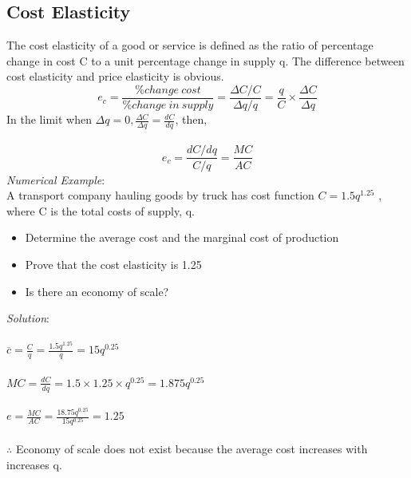 \subsection{Cost Elasticity}
The cost elasticity of a good or service is defined as the ratio of percentage change in cost C to a unit percentage change in supply q. The difference between cost elasticity and price elasticity is obvious.
\begin{equation}
	e_c = \frac{\% change \: cost}{\% change \: in \: supply} = \frac{\Delta C/C}{\Delta q/q} = \frac{q}{C} \times \frac{\Delta C}{\Delta q}
\end{equation}
In the limit when $\Delta q = 0, \frac{\Delta C}{\Delta q} = \frac{dC}{dq}$, then,\\\\
\begin{equation}
	e_c = \frac{dC/dq}{C/q} = \frac{MC}{AC}
\end{equation}
\textit{Numerical Example}:\\
A transport company hauling goods by truck has cost function $ C = 1.5q^{1.25}$ , where C is the total costs of supply, q.
\begin{itemize}
	\item Determine the average cost and the marginal cost of production
	\item Prove that the cost elasticity is 1.25
	\item Is there an economy of scale?
\end{itemize}
\textit{Solution}:\\\\
$ \overline{c} = \frac{C}{q} = \frac{1.5q^{1.25}}{q} = 15q^{0.25}$\\\\
$ MC = \frac{dC}{dq} = 1.5 \times 1.25 \times q^{0.25} = 1.875q^{0.25}$\\\\
$ e = \frac{MC}{AC} = \frac{18.75q^{0.25}}{15q^{0.25}} = 1.25$\\\\
$\therefore$ Economy of scale does not exist because the average cost increases with increases q.
%
